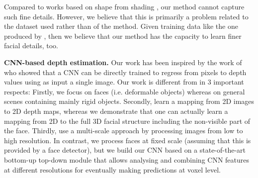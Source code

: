
Compared to works based on shape from shading \cite{kemelmacher20113d, suwajanakorn2014total}, our method cannot capture such fine details. However, we believe that this is primarily a problem related to the dataset used rather than of the method. Given training data like the one produced by \cite{kemelmacher20113d, suwajanakorn2014total}, then we believe that our method has the capacity to learn finer facial details, too.

\textbf{CNN-based depth estimation.} Our work has been inspired by the
work of \cite{eigen2015predicting, eigen2014depth} who showed that a
CNN can be directly trained to regress from pixels to depth values
using as input a single image. Our work is different from
\cite{eigen2015predicting, eigen2014depth} in 3 important respects:
Firstly, we focus on faces (i.e. deformable objects) whereas
\cite{eigen2015predicting, eigen2014depth} on general scenes
containing mainly rigid objects. Secondly, \cite{eigen2015predicting,
  eigen2014depth} learn a mapping from 2D images to 2D depth maps,
whereas we demonstrate that one can actually learn a mapping from 2D
to the full 3D facial structure including the non-visible part of the
face. Thirdly, \cite{eigen2015predicting, eigen2014depth} use a
multi-scale approach by processing images from low to high
resolution. In contrast, we process faces at fixed scale (assuming
that this is provided by a face detector), but we build our CNN based
on a state-of-the-art bottom-up top-down module
\cite{newell2016stacked} that allows analysing and combining CNN
features at different resolutions for eventually making predictions at
voxel level.

